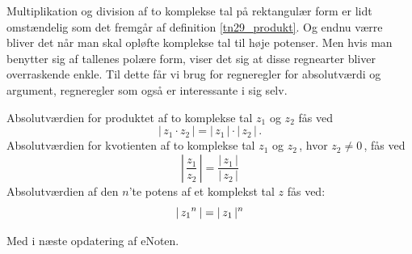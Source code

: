 

Multiplikation og division af to komplekse tal på rektangulær form er lidt omstændelig som det fremgår af definition \ref{tn29_produkt}. Og endnu værre bliver det når man skal opløfte komplekse tal til høje potenser. Men hvis man benytter sig af tallenes polære form, viser det sig at disse regnearter bliver overraskende enkle. Til dette får vi brug for regneregler for absolutværdi og argument, regneregler som også er interessante i sig selv. \bs 
\begin{theorem}\label{tn29_RegnAbs}
Absolutværdien for produktet af to komplekse tal $z_1$ og $z_2$ fås ved
\begin{equation}\label{tn29_RegnAbs1}
|\,z_1\cdot z_2\,|=|\,z_1\,|\cdot|\,z_2\,|\,.
\end{equation}
Absolutværdien for kvotienten af to komplekse tal $z_1$ og $z_2\,$, hvor $z_2\neq 0\,$, fås ved
\begin{equation}\label{tn29_RegnAbs2}
\left|\,\frac{z_1}{z_2}\,\right|=\frac{\left|\,z_1\,\right|}{\left|\,z_2\,\right|}
\end{equation}
Absolutværdien af den $n$'te potens af et  komplekst tal $z$ fås ved:
\begin{equation}\label{tn29_RegnAbs3}
|\,{z_1}^n\,|=|\,z_1\,|^n\\
\end{equation}
\end{theorem}
\begin{bevis}
Med i næste opdatering af eNoten.
\end{bevis}

